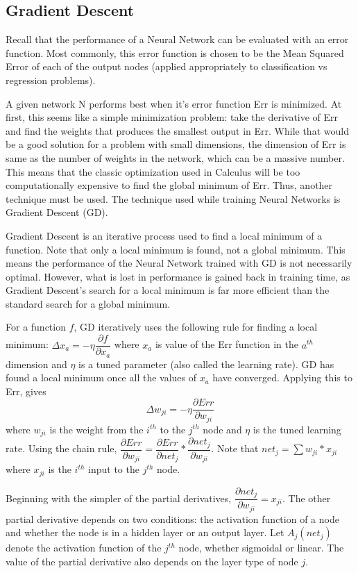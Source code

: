 \documentclass[twoside,11pt]{article}
\newcommand{\jth}{$j^{th}$ }
\begin{document}
\subsection{Gradient Descent}
Recall that the performance of a Neural Network can be evaluated with an error function.
Most commonly, this error function is chosen to be the Mean Squared Error of each of the output nodes (applied appropriately to classification vs regression problems).

A given network N performs best when it's error function Err is minimized.
At first, this seems like a simple minimization problem: take the derivative of Err and find the weights that produces the smallest output in Err.
While that would be a good solution for a problem with small dimensions, the dimension of Err is same as the number of weights in the network, which can be a massive number.
This means that the classic optimization used in Calculus will be too computationally expensive to find the global minimum of Err. Thus, another technique must be used.
The technique used while training Neural Networks is Gradient Descent (GD).

Gradient Descent is an iterative process used to find a local minimum of a function. Note that only a local minimum is found, not a global minimum.
This means the performance of the Neural Network trained with GD is not necessarily optimal.
However, what is lost in performance is gained back in training time, as Gradient Descent's search for a local minimum is far more efficient than the standard search for a global minimum.

For a function $f$, GD iteratively uses the following rule for finding a local minimum:
$\Delta x_a = - \eta \dfrac{\partial f}{\partial x_a}$ where $x_a$ is value of the Err function in the $a^{th}$ dimension and $\eta$ is a tuned parameter (also called the learning rate). GD has found a local minimum once all the values of $x_a$ have converged.
Applying this to Err, gives
$$\Delta w_{ji} = - \eta \dfrac{\partial Err}{\partial w_{ji}}$$
where $w_{ji}$ is the weight from the $i^{th}$ to the $j^{th}$ node and $\eta$ is the tuned learning rate. Using the chain rule,
$\dfrac{\partial Err}{\partial w_{ji}} = \dfrac{\partial Err}{\partial net_{j}} * \dfrac{\partial net_j}{\partial w_{ji}}$. Note that $net_j = \sum w_{ji} * x_{ji}$ where $x_{ji}$ is the $i^{th}$ input to the $j^{th}$ node.

Beginning with the simpler of the partial derivatives, $\dfrac{\partial net_j}{\partial w_{ji}} = x_{ji}$.
The other partial derivative depends on two conditions: the activation function of a node and whether the node is in a hidden layer or an output layer. Let $A_j(net_j)$ denote the activation function of the \jth node, whether sigmoidal or linear. 
The value of the partial derivative also depends on the layer type of node $j$. 
\end{document}
